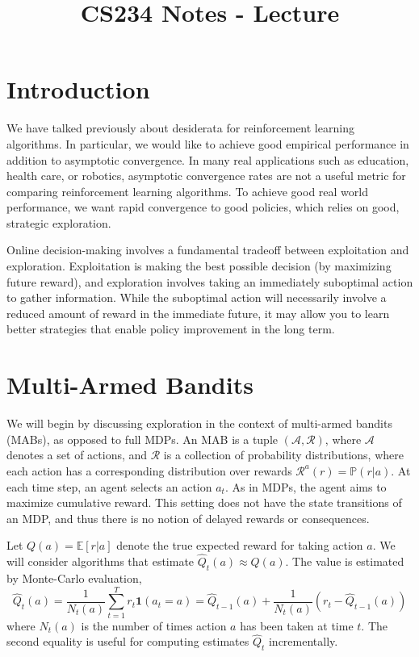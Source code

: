\documentclass{article}
\title{CS234 Notes - Lecture \lecturenum \\ \lecturetitle }
\author{ \lecturescribe }
\newcommand{\E}{\mathbb{E}}                                        %
\begin{document}
\maketitle

\section{Introduction}

We have talked previously about desiderata for reinforcement learning algorithms. In particular, we would like to achieve good empirical performance in addition to asymptotic convergence. In many real applications such as education, health care, or robotics, asymptotic convergence rates are not a useful metric for comparing reinforcement learning algorithms. To achieve good real world performance, we want rapid convergence to good policies, which relies on good, strategic exploration.

Online decision-making involves a fundamental tradeoff between exploitation and exploration. Exploitation is making the best possible decision (by maximizing future reward), and exploration involves taking an immediately suboptimal action to gather information. While the suboptimal action will necessarily involve a reduced amount of reward in the immediate future, it may allow you to learn better strategies that enable policy improvement in the long term.

\section{Multi-Armed Bandits}

We will begin by discussing exploration in the context of multi-armed bandits (MABs), as opposed to full MDPs. An MAB is a tuple $(\mathcal{A},\mathcal{R})$, where $\mathcal{A}$ denotes a set of actions, and $\mathcal{R}$ is a collection of probability distributions, where each action has a corresponding distribution over rewards $\mathcal{R}^a(r) = \mathbb{P}(r | a)$. At each time step, an agent selects an action $a_t$. As in MDPs, the agent aims to maximize cumulative reward. This setting does not have the state transitions of an MDP, and thus there is no notion of delayed rewards or consequences.

Let $Q(a) = \E[r|a]$ denote the true expected reward for taking action $a$. We will consider algorithms that estimate $\hat{Q}_t(a) \approx Q(a)$. The value is estimated by Monte-Carlo evaluation,
\begin{equation}
    \hat{Q}_t(a)
    = \frac{1}{N_t(a)} \sum_{t=1}^T r_t \mathbf{1}(a_t = a)
    = \hat{Q}_{t-1}(a) + \frac{1}{N_t(a)} \left( r_t - \hat{Q}_{t-1}(a) \right)
\end{equation}
where $N_t(a)$ is the number of times action $a$ has been taken at time $t$. The second equality is useful for computing estimates $\hat{Q}_t$ incrementally.
\end{document}
